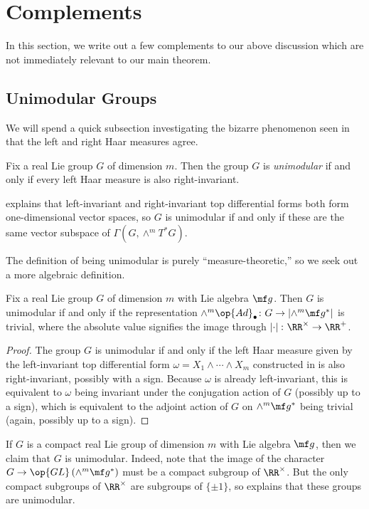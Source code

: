 \documentclass[notes.tex]{subfiles}
\begin{document}
\section{Complements} \label{sec:comp}
In this section, we write out a few complements to our above discussion which are not immediately relevant to our main theorem.

\subsection{Unimodular Groups}
We will spend a quick subsection investigating the bizarre phenomenon seen in  that the left and right Haar measures agree.
\begin{definition}[unimodular]
	Fix a real Lie group $G$ of dimension $m$. Then the group $G$ is \textit{unimodular} if and only if every left Haar measure is also right-invariant.
\end{definition}
\begin{remark}
	 explains that left-invariant and right-invariant top differential forms both form one-dimensional vector spaces, so $G$ is unimodular if and only if these are the same vector subspace of $\Gamma(G,\land^mT^*G)$.
\end{remark}
The definition of being unimodular is purely ``measure-theoretic,'' so we seek out a more algebraic definition.
\begin{lemma} \label{lem:det-adjoint-for-unimodular}
	Fix a real Lie group $G$ of dimension $m$ with Lie algebra $\mf g$. Then $G$ is unimodular if and only if the representation $\land^m\op{Ad}_\bullet\colon G\to\left|\land^m\mf g^*\right|$ is trivial, where the absolute value signifies the image through $\left|\cdot\right|\colon\RR^\times\to\RR^+$.
\end{lemma}
\begin{proof}
	The group $G$ is unimodular if and only if the left Haar measure given by the left-invariant top differential form $\omega=X_1\land\cdots\land X_m$ constructed in  is also right-invariant, possibly with a sign. Because $\omega$ is already left-invariant, this is equivalent to $\omega$ being invariant under the conjugation action of $G$ (possibly up to a sign), which is equivalent to the adjoint action of $G$ on $\land^m\mf g^*$ being trivial (again, possibly up to a sign).
\end{proof}
\begin{example} \label{ex:compact-unimodular}
	If $G$ is a compact real Lie group of dimension $m$ with Lie algebra $\mf g$, then we claim that $G$ is unimodular. Indeed, note that the image of the character $G\to\op{GL}\left(\land^m\mf g^*\right)$ must be a compact subgroup of $\RR^\times$. But the only compact subgroups of $\RR^\times$ are subgroups of $\{\pm1\}$, so  explains that these groups are unimodular.
\end{example}
\end{document}
